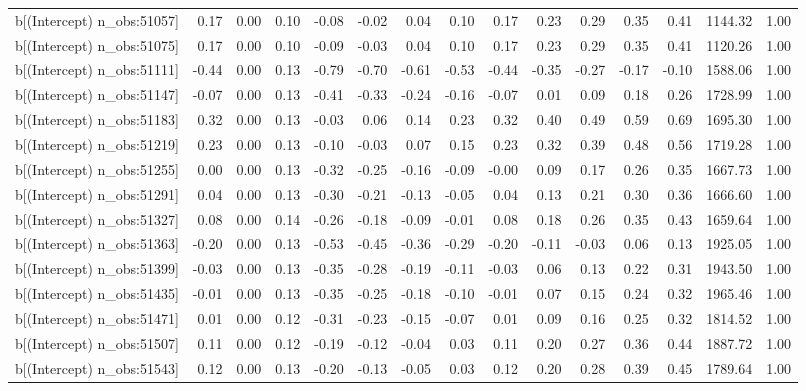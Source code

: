 \begin{table}[ht]
\begin{tabular}{rrrrrrrrrrrrrrr}
  b[(Intercept) n\_obs:51057] & 0.17 & 0.00 & 0.10 & -0.08 & -0.02 & 0.04 & 0.10 & 0.17 & 0.23 & 0.29 & 0.35 & 0.41 & 1144.32 & 1.00 \\ 
  b[(Intercept) n\_obs:51075] & 0.17 & 0.00 & 0.10 & -0.09 & -0.03 & 0.04 & 0.10 & 0.17 & 0.23 & 0.29 & 0.35 & 0.41 & 1120.26 & 1.00 \\ 
  b[(Intercept) n\_obs:51111] & -0.44 & 0.00 & 0.13 & -0.79 & -0.70 & -0.61 & -0.53 & -0.44 & -0.35 & -0.27 & -0.17 & -0.10 & 1588.06 & 1.00 \\ 
  b[(Intercept) n\_obs:51147] & -0.07 & 0.00 & 0.13 & -0.41 & -0.33 & -0.24 & -0.16 & -0.07 & 0.01 & 0.09 & 0.18 & 0.26 & 1728.99 & 1.00 \\ 
  b[(Intercept) n\_obs:51183] & 0.32 & 0.00 & 0.13 & -0.03 & 0.06 & 0.14 & 0.23 & 0.32 & 0.40 & 0.49 & 0.59 & 0.69 & 1695.30 & 1.00 \\ 
  b[(Intercept) n\_obs:51219] & 0.23 & 0.00 & 0.13 & -0.10 & -0.03 & 0.07 & 0.15 & 0.23 & 0.32 & 0.39 & 0.48 & 0.56 & 1719.28 & 1.00 \\ 
  b[(Intercept) n\_obs:51255] & 0.00 & 0.00 & 0.13 & -0.32 & -0.25 & -0.16 & -0.09 & -0.00 & 0.09 & 0.17 & 0.26 & 0.35 & 1667.73 & 1.00 \\ 
  b[(Intercept) n\_obs:51291] & 0.04 & 0.00 & 0.13 & -0.30 & -0.21 & -0.13 & -0.05 & 0.04 & 0.13 & 0.21 & 0.30 & 0.36 & 1666.60 & 1.00 \\ 
  b[(Intercept) n\_obs:51327] & 0.08 & 0.00 & 0.14 & -0.26 & -0.18 & -0.09 & -0.01 & 0.08 & 0.18 & 0.26 & 0.35 & 0.43 & 1659.64 & 1.00 \\ 
  b[(Intercept) n\_obs:51363] & -0.20 & 0.00 & 0.13 & -0.53 & -0.45 & -0.36 & -0.29 & -0.20 & -0.11 & -0.03 & 0.06 & 0.13 & 1925.05 & 1.00 \\ 
  b[(Intercept) n\_obs:51399] & -0.03 & 0.00 & 0.13 & -0.35 & -0.28 & -0.19 & -0.11 & -0.03 & 0.06 & 0.13 & 0.22 & 0.31 & 1943.50 & 1.00 \\ 
  b[(Intercept) n\_obs:51435] & -0.01 & 0.00 & 0.13 & -0.35 & -0.25 & -0.18 & -0.10 & -0.01 & 0.07 & 0.15 & 0.24 & 0.32 & 1965.46 & 1.00 \\ 
  b[(Intercept) n\_obs:51471] & 0.01 & 0.00 & 0.12 & -0.31 & -0.23 & -0.15 & -0.07 & 0.01 & 0.09 & 0.16 & 0.25 & 0.32 & 1814.52 & 1.00 \\ 
  b[(Intercept) n\_obs:51507] & 0.11 & 0.00 & 0.12 & -0.19 & -0.12 & -0.04 & 0.03 & 0.11 & 0.20 & 0.27 & 0.36 & 0.44 & 1887.72 & 1.00 \\ 
  b[(Intercept) n\_obs:51543] & 0.12 & 0.00 & 0.13 & -0.20 & -0.13 & -0.05 & 0.03 & 0.12 & 0.20 & 0.28 & 0.39 & 0.45 & 1789.64 & 1.00 \\ 

\end{tabular}
\end{table}
